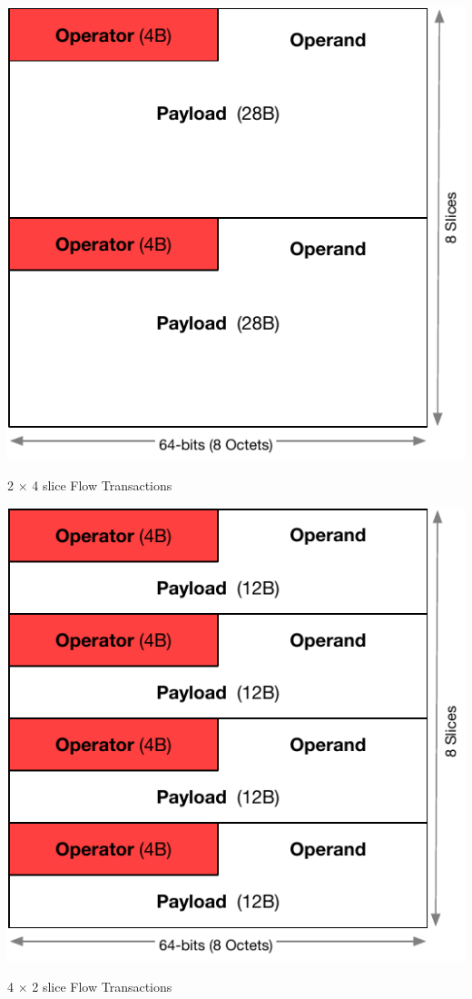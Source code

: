 \documentclass[../OAE-SPEC-MAIN.tex]{subfiles}
\begin{document}
\begin{marginfigure}
  \includegraphics[width=\linewidth]{./figures/2-flow-subtransactions.pdf}
  \caption{2 $\times$ 4 slice Flow Transactions }
  \vspace{8pt}
\end{marginfigure}

\begin{marginfigure}
  \includegraphics[width=\linewidth]{./figures/4-flow-subtransactions.pdf}
  \caption{4 $\times$ 2 slice Flow Transactions}
  \vspace{8pt}
\end{marginfigure}
\end{document}
